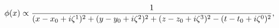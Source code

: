 \begin{equation}
\phi(x) \propto {1\over 
(x-x_0+i\zeta^1)^2+(y-y_0+i\zeta^2)^2+(z-z_0+i\zeta^3)^2-(t-t_0+i\zeta^0)^2},
\end{equation}


